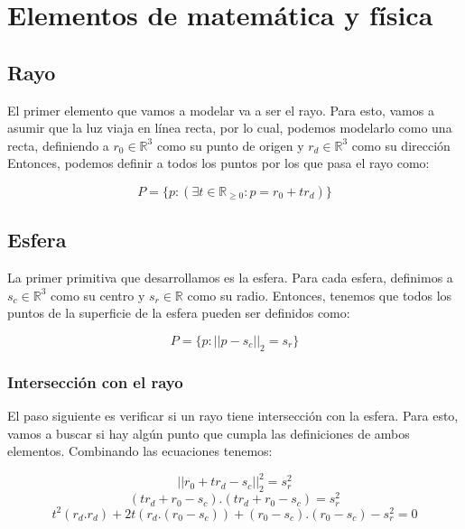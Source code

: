 \section{Elementos de matemática y física}

\subsection{Rayo}

El primer elemento que vamos a modelar va a ser el rayo. Para esto, vamos a asumir que la luz viaja en línea recta, por lo cual, podemos modelarlo como una recta, definiendo a $r_0 \in \mathbb{R}^3$ como su punto de origen y $r_d \in \mathbb{R}^3$ como su dirección Entonces, podemos definir a todos los puntos por los que pasa el rayo como:

\begin{equation}
P = \{p:(\exists t \in \mathbb{R}_{\geq 0}: p = r_0 + t r_d)\}
\end{equation}

\subsection{Esfera}

La primer primitiva que desarrollamos es la esfera. Para cada esfera, definimos a $s_c \in \mathbb{R}^3$ como su centro y $s_r \in \mathbb{R}$ como su radio. Entonces, tenemos que todos los puntos de la superficie de la esfera pueden ser definidos como:

\begin{equation}
P = \{p: ||p-s_c||_2 = s_r\}
\end{equation}

\subsubsection{Intersección con el rayo}

El paso siguiente es verificar si un rayo tiene intersección con la esfera. Para esto, vamos a buscar si hay algún punto que cumpla las definiciones de ambos elementos. Combinando las ecuaciones tenemos:

\begin{equation}
||r_0 + t r_d - s_c||_2^2 = s_r^2
\end{equation}
\begin{equation}
(t r_d + r_0 - s_c) . (t r_d + r_0 - s_c) = s_r^2
\end{equation}
\begin{equation}
t^2 (r_d.r_d) + 2t(r_d.(r_0 - s_c)) + (r_0 - s_c). (r_0 - s_c) - s_r^2 = 0
\end{equation}

